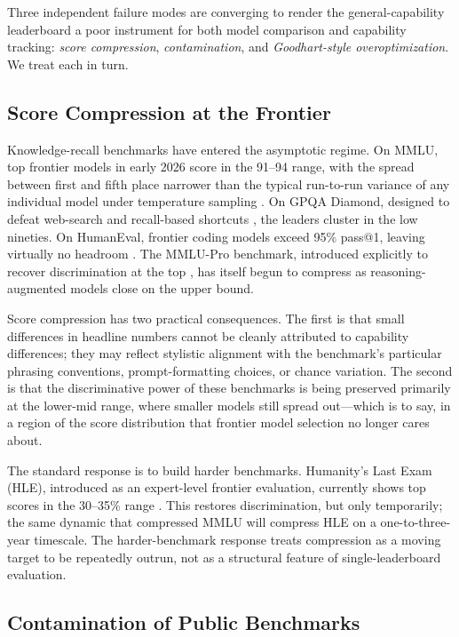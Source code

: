 \documentclass[11pt,a4paper]{article}
\begin{document}
Three independent failure modes are converging to render the general-capability leaderboard a poor instrument for both model comparison and capability tracking: \textit{score compression}, \textit{contamination}, and \textit{Goodhart-style overoptimization}. We treat each in turn.

\subsection{Score Compression at the Frontier}
\label{sec:compression}

Knowledge-recall benchmarks have entered the asymptotic regime. On MMLU, top frontier models in early 2026 score in the 91--94 range, with the spread between first and fifth place narrower than the typical run-to-run variance of any individual model under temperature sampling \citep{artificialanalysis2026}. On GPQA Diamond, designed to defeat web-search and recall-based shortcuts \citep{rein2023gpqa}, the leaders cluster in the low nineties. On HumanEval, frontier coding models exceed 95\% pass@1, leaving virtually no headroom \citep{chen2021evaluating}. The MMLU-Pro benchmark, introduced explicitly to recover discrimination at the top \citep{wang2024mmlupro}, has itself begun to compress as reasoning-augmented models close on the upper bound.

Score compression has two practical consequences. The first is that small differences in headline numbers cannot be cleanly attributed to capability differences; they may reflect stylistic alignment with the benchmark's particular phrasing conventions, prompt-formatting choices, or chance variation. The second is that the discriminative power of these benchmarks is being preserved primarily at the lower-mid range, where smaller models still spread out---which is to say, in a region of the score distribution that frontier model selection no longer cares about.

The standard response is to build harder benchmarks. Humanity's Last Exam (HLE), introduced as an expert-level frontier evaluation, currently shows top scores in the 30--35\% range \citep{phan2025hle}. This restores discrimination, but only temporarily; the same dynamic that compressed MMLU will compress HLE on a one-to-three-year timescale. The harder-benchmark response treats compression as a moving target to be repeatedly outrun, not as a structural feature of single-leaderboard evaluation.

\subsection{Contamination of Public Benchmarks}
\label{sec:contamination}
\end{document}

